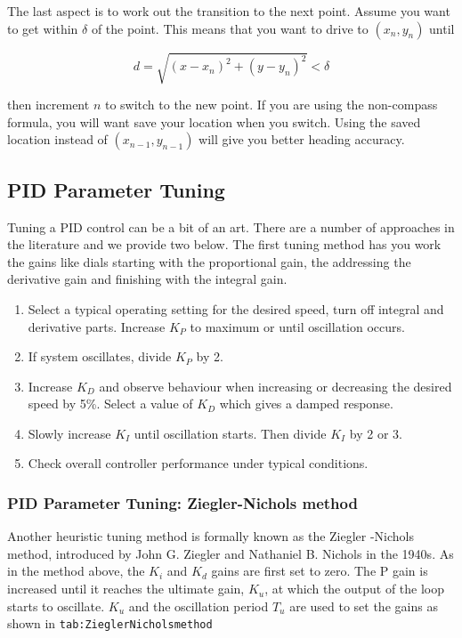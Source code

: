 The last aspect is to work out the transition to the next point. Assume
you want to get within \(\delta\) of the point. This means that you want
to drive to \((x_n, y_n)\) until

\[d = \sqrt{(x-x_n)^2 + (y - y_n)^2} < \delta\]

then increment \(n\) to switch to the new point. If you are using the
non-compass formula, you will want save your location when you switch.
Using the saved location instead of \((x_{n-1}, y_{n-1})\) will give you
better heading accuracy.

\hypertarget{pid-parameter-tuning}{%
\subsection{PID Parameter Tuning}\label{pid-parameter-tuning}}

Tuning a PID control can be a bit of an art. There are a number of
approaches in the literature and we provide two below. The first tuning
method has you work the gains like dials starting with the proportional
gain, the addressing the derivative gain and finishing with the integral
gain.

\begin{enumerate}
\tightlist
\item
  Select a typical operating setting for the desired speed, turn off
  integral and derivative parts. Increase \(K_P\) to maximum or until
  oscillation occurs.
\item
  If system oscillates, divide \(K_P\) by 2.
\item
  Increase \(K_D\) and observe behaviour when increasing or decreasing
  the desired speed by 5\%. Select a value of \(K_D\) which gives a
  damped response.
\item
  Slowly increase \(K_I\) until oscillation starts. Then divide \(K_I\)
  by 2 or 3.
\item
  Check overall controller performance under typical conditions.
\end{enumerate}

\hypertarget{pid-parameter-tuning-ziegler-nichols-method}{%
\subsubsection{PID Parameter Tuning: Ziegler-Nichols
method}\label{pid-parameter-tuning-ziegler-nichols-method}}

Another heuristic tuning method is formally known as the Ziegler
-Nichols method, introduced by John G. Ziegler and Nathaniel B. Nichols
in the 1940s. As in the method above, the \(K_i\) and \(K_d\) gains are
first set to zero. The P gain is increased until it reaches the ultimate
gain, \(K_u\), at which the output of the loop starts to oscillate.
\(K_u\) and the oscillation period \(T_u\) are used to set the gains as
shown in \texttt{tab:ZieglerNicholsmethod}

